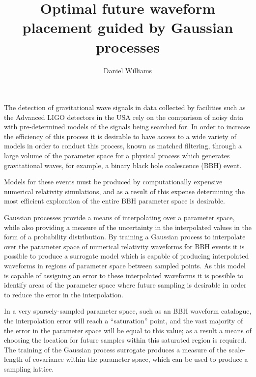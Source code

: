 \documentclass[a4paper]{article}
\title{Optimal future waveform placement guided by Gaussian processes}
\author{Daniel Williams}
\begin{document}
\maketitle


The detection of gravitational wave signals in data collected by
facilities such as the Advanced LIGO detectors in the USA rely on the
comparison of noisy data with pre-determined models of the signals
being searched for. In order to increase the efficiency of this
process it is desirable to have access to a wide variety of models in
order to conduct this process, known as matched filtering, through a
large volume of the parameter space for a physical process which
generates gravitational waves, for example, a binary black hole
coalescence (BBH) event.

Models for these events must be produced by computationally expensive
numerical relativity simulations, and as a result of this expense
determining the most efficient exploration of the entire BBH parameter
space is desirable. 

Gaussian processes provide a means of interpolating over a parameter
space, while also providing a measure of the uncertainty in the
interpolated values in the form of a probability distribution. By
training a Gaussian process to interpolate over the parameter space of
numerical relativity waveforms for BBH events it is possible to
produce a surrogate model which is capable of producing interpolated
waveforms in regions of parameter space between sampled points. As
this model is capable of assigning an error to these interpolated
waveforms it is possible to identify areas of the parameter space
where future sampling is desirable in order to reduce the error in the
interpolation.

In a very sparsely-sampled parameter space, such as an BBH waveform
catalogue, the interpolation error will reach a ``saturation'' point,
and the vast majority of the error in the parameter space will be
equal to this value; as a result a means of choosing the location for
future samples within this saturated region is required. The training
of the Gaussian process surrogate produces a measure of the
scale-length of covariance within the parameter space, which can be
used to produce a sampling lattice.

\end{document}
